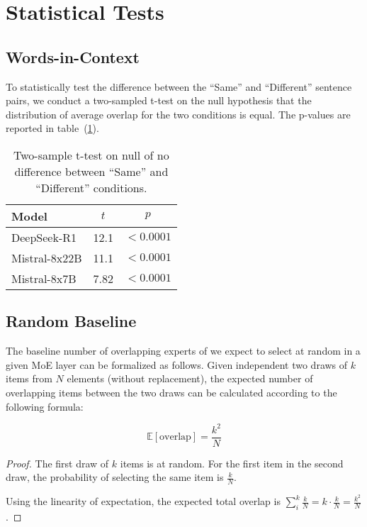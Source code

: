\appendix


\section{Statistical Tests}

\subsection{Words-in-Context}\label{apd:stats_wic}

To statistically test the difference between the ``Same'' and ``Different'' sentence pairs, we conduct a two-sampled t-test on the null hypothesis that the distribution of average overlap for the two conditions is equal. The p-values are reported in table~(\ref{tab:t-test}).

\begin{table}[h]
\centering
\begin{tabular}{l|cc}
  \toprule
  \textbf{Model} & $t$ & $p$ \\
  \midrule
  DeepSeek-R1 & 12.1 & $<0.0001$ \\
  Mistral-8x22B & 11.1 & $<0.0001$ \\
  Mistral-8x7B & 7.82 & $<0.0001$ \\
  \bottomrule
\end{tabular}
\caption{Two-sample t-test on null of no difference between ``Same'' and ``Different'' conditions.}
\label{tab:t-test}
\end{table}

\subsection{Random Baseline}\label{apd:stats_formula}

The baseline number of overlapping experts of we expect to select at random in a given MoE layer can be formalized as follows.
Given independent two draws of $k$ items from $N$ elements (without replacement), the expected number of overlapping items between the two draws can be calculated according to the following formula:

$$
    \mathbb{E}[\text{overlap}] = \frac{k^2}{N}
$$

\begin{proof}
The first draw of $k$ items is at random. For the first item in the second draw, the probability of selecting the same item is $\frac{k}{N}$.

Using the linearity of expectation, the expected total overlap is $\sum_i^k\frac{k}{N}=k\cdot\frac{k}{N}=\frac{k^2}{N}$.
\end{proof}


